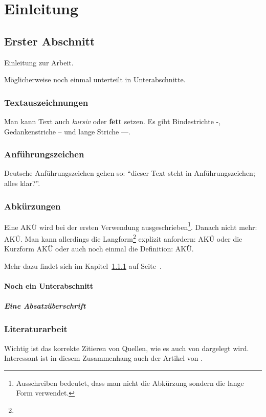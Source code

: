 \chapter{Einleitung}

\section{Erster Abschnitt}

Einleitung zur Arbeit.

Möglicherweise noch einmal unterteilt in Unterabschnitte.


\subsection{Textauszeichnungen}
\label{Einleitung:Textauszeichnungen}

Man kann Text auch \textit{kursiv} oder \textbf{fett} setzen. Es gibt Bindestrichte -, Gedankenstriche -- und lange Striche ---.


\subsection{Anführungszeichen}

Deutsche Anführungszeichen gehen so: "`dieser Text steht in \glq Anführungszeichen\grq; alles klar?"'.


\subsection{Abkürzungen}

Eine \ac{AKÜ} wird bei der ersten Verwendung ausgeschrieben\footnote{Ausschreiben bedeutet, dass man nicht die Abkürzung sondern die lange Form verwendet.}. Danach nicht mehr: \ac{AKÜ}. Man kann allerdings die Langform\footnote{\blindtext} explizit anfordern: \acl{AKÜ} oder die Kurzform \acs{AKÜ} oder auch noch einmal die Definition: \acf{AKÜ}.

Mehr dazu findet sich im Kapitel~\ref{Einleitung:Textauszeichnungen} auf Seite~\pageref{Einleitung:Textauszeichnungen}.




\subsubsection{Noch ein Unterabschnitt}

\paragraph{Eine Absatzüberschrift}

\blindtext[1]


\subsection{Literaturarbeit}

Wichtig ist das korrekte Zitieren von Quellen, wie es auch von \cite{Kornmeier2011} dargelegt wird. Interessant ist in diesem Zusammenhang auch der Artikel von \cite{Vixie2007}.

\blindtext[4]